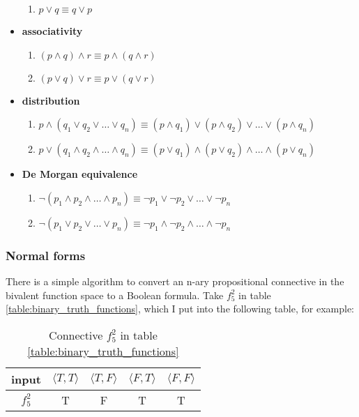 \documentclass[12pt, letterpaper]{article}
\begin{document}
\begin{itemize}
\begin{enumerate}
          \item $p \lor q \equiv q \lor p$
        \end{enumerate}
  \item \textbf{associativity}
        \begin{enumerate}
          \item $(p \land q) \land r \equiv p \land (q \land r)$
          \item $(p \lor q) \lor r \equiv p \lor (q \lor r)$
        \end{enumerate}
  \item \textbf{distribution}
        \begin{enumerate}
          \item $p \land (q_1 \lor q_2 \lor \ldots \lor q_n) \equiv (p \land q_1)
                  \lor (p \land q_2) \lor \ldots \lor (p \land q_n)$
          \item $p \lor (q_1 \land q_2 \land \ldots \land q_n) \equiv (p \lor q_1)
                  \land (p \lor q_2) \land \ldots \land (p \lor q_n)$
        \end{enumerate}
  \item \textbf{De Morgan equivalence}
        \begin{enumerate}
          \item $\lnot (p_1 \land p_2 \land \ldots \land p_n) \equiv \lnot p_1
                  \lor \lnot p_2 \lor \ldots \lor \lnot p_n$
          \item $\lnot (p_1 \lor p_2 \lor \ldots \lor p_n) \equiv \lnot p_1
                  \land \lnot p_2 \land \ldots \land \lnot p_n$
        \end{enumerate}
\end{itemize}

\subsubsection{Normal forms}

There is a simple algorithm to convert an n-ary propositional connective in the
bivalent function space to a Boolean formula. Take $f_5^2$ in table
\ref{table:binary_truth_functions}, which I put into the following table, for
example:

\begin{table}[H]
  \centering
  \begin{tabular}{|c|c|c|c|c|}
    \hline
    input   & $\langle T, T \rangle$ & $\langle T, F \rangle$ & $\langle F, T \rangle$ & $\langle F, F \rangle$ \\ [1ex] \hline
    $f_5^2$ & T                      & F                      & T                      & T                      \\ [0.5ex] \hline
  \end{tabular}
  \caption{Connective $f_5^2$ in table \ref{table:binary_truth_functions}}
  \label{table:f52}
\end{table}
\end{document}
